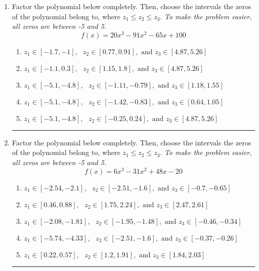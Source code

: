 \documentclass[14pt]{extbook}
\newcommand{\litem}[1]{\item#1\hspace*{-1cm}\rule{\textwidth}{0.4pt}}
\begin{document}
\begin{enumerate}
{\begin{enumerate}[label=\Alph*.]
\end{enumerate} }
\litem{
Factor the polynomial below completely. Then, choose the intervals the zeros of the polynomial belong to, where $z_1 \leq z_2 \leq z_3$. \textit{To make the problem easier, all zeros are between -5 and 5.}\[ f(x) = 20x^{3} -91 x^{2} -65 x + 100 \]\begin{enumerate}[label=\Alph*.]
\item \( z_1 \in [-1.7, -1], \text{   }  z_2 \in [0.77, 0.91], \text{   and   } z_3 \in [4.87, 5.26] \)
\item \( z_1 \in [-1.1, 0.3], \text{   }  z_2 \in [1.15, 1.8], \text{   and   } z_3 \in [4.87, 5.26] \)
\item \( z_1 \in [-5.1, -4.8], \text{   }  z_2 \in [-1.11, -0.79], \text{   and   } z_3 \in [1.18, 1.55] \)
\item \( z_1 \in [-5.1, -4.8], \text{   }  z_2 \in [-1.42, -0.83], \text{   and   } z_3 \in [0.64, 1.05] \)
\item \( z_1 \in [-5.1, -4.8], \text{   }  z_2 \in [-0.25, 0.24], \text{   and   } z_3 \in [4.87, 5.26] \)

\end{enumerate} }
\litem{
Factor the polynomial below completely. Then, choose the intervals the zeros of the polynomial belong to, where $z_1 \leq z_2 \leq z_3$. \textit{To make the problem easier, all zeros are between -5 and 5.}\[ f(x) = 6x^{3} -31 x^{2} +48 x -20 \]\begin{enumerate}[label=\Alph*.]
\item \( z_1 \in [-2.54, -2.1], \text{   }  z_2 \in [-2.51, -1.6], \text{   and   } z_3 \in [-0.7, -0.65] \)
\item \( z_1 \in [0.46, 0.88], \text{   }  z_2 \in [1.75, 2.24], \text{   and   } z_3 \in [2.47, 2.61] \)
\item \( z_1 \in [-2.08, -1.81], \text{   }  z_2 \in [-1.95, -1.48], \text{   and   } z_3 \in [-0.46, -0.34] \)
\item \( z_1 \in [-5.74, -4.33], \text{   }  z_2 \in [-2.51, -1.6], \text{   and   } z_3 \in [-0.37, -0.26] \)
\item \( z_1 \in [0.22, 0.57], \text{   }  z_2 \in [1.2, 1.91], \text{   and   } z_3 \in [1.84, 2.03] \)


\end{enumerate}}
\end{enumerate}
\end{document}
